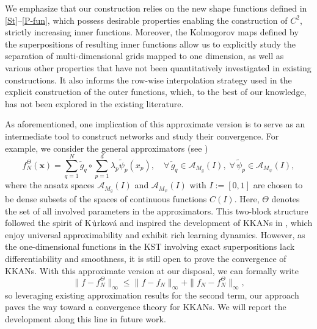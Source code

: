 \documentclass[10pt,reqno,final]{amsart}
\theoremstyle{remark}
\theoremstyle{definition}
\begin{document}

 We emphasize that our construction relies on  the new shape functions defined in \eqref{St}--\eqref{P-fun}, which possess desirable properties enabling the construction of $C^2$, strictly increasing inner functions. Moreover, the  Kolmogorov maps defined by the superpositions of resulting inner functions allow us to explicitly study the separation of multi-dimensional grids mapped to one dimension, as well as various other properties that have not been quantitatively investigated in existing constructions. It also informs the row-wise interpolation strategy used in the explicit construction of the outer functions, which, to the best of our knowledge, has not been explored in the existing literature.

 
 As aforementioned, one implication of this approximate version is to serve as an intermediate tool to construct networks and study their 
convergence.  For example,  we consider the general  approximators (see \cite{Toscano2024kkans}) 
\begin{equation}\label{KappM}
f_N^{\Theta}(\boldsymbol{x})=\sum_{q=1}^{N}  \tilde g_q\circ\sum_{p=1}^d \lambda_p \tilde \psi_{p}(x_p),\quad  \forall\, \tilde g_q\in {\mathcal A}_{M_g}(I),\; \forall\, \tilde \psi_{p}\in   {\mathcal A}_{M_\psi}(I), 
\end{equation}
where the ansatz spaces ${\mathcal A}_{M_g}(I)$ and ${\mathcal A}_{M_\psi}(I)$ with $I:=[0,1]$ 
 are chosen to be dense subsets of the spaces of continuous functions $C(I).$   Here, $\Theta$ denotes the set of all involved parameters in the approximators.  This two-block structure followed  the spirit of K{$\dot {\rm u}$}rkov{\'a} \cite{Kourkova1991,Kuurkova1992kolmogorov} and inspired the development of KKANs in \cite{Toscano2024kkans}, which enjoy universal approximability and exhibit rich learning dynamics. 
However, as the one-dimensional functions in the KST involving exact superpositions 
 lack differentiability and smoothness,   it is still open to prove the convergence of KKANs.   With this  approximate version at our disposal, we can formally write
 \begin{equation}\label{newcons}
 \|f-f_N^{\Theta}\|_\infty\le   \|f-f_N\|_\infty +  \|f_N-f_N^{\Theta}\|_\infty,
 \end{equation}
 so leveraging existing approximation results for the second term, our approach paves the way toward a convergence theory for KKANs. We will report the development along this line in future work. 
\end{document}
